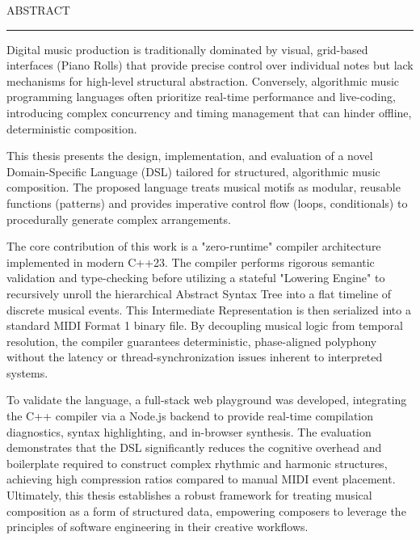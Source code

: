 ABSTRACT

\vspace{0.5cm}
\hrule
\vspace{0.5cm}

Digital music production is traditionally dominated by visual, grid-based interfaces (Piano Rolls) that
provide precise control over individual notes but lack mechanisms for high-level structural abstraction.
Conversely, algorithmic music programming languages often prioritize real-time performance and live-coding,
introducing complex concurrency and timing management that can hinder offline, deterministic composition.

This thesis presents the design, implementation, and evaluation of a novel Domain-Specific Language (DSL)
tailored for structured, algorithmic music composition. The proposed language treats musical motifs as
modular, reusable functions (patterns) and provides imperative control flow (loops, conditionals) to
procedurally generate complex arrangements.

The core contribution of this work is a "zero-runtime" compiler architecture implemented in modern C++23. The
compiler performs rigorous semantic validation and type-checking before utilizing a stateful "Lowering
Engine" to recursively unroll the hierarchical Abstract Syntax Tree into a flat timeline of discrete musical
events. This Intermediate Representation is then serialized into a standard MIDI Format 1 binary file. By
decoupling musical logic from temporal resolution, the compiler guarantees deterministic, phase-aligned
polyphony without the latency or thread-synchronization issues inherent to interpreted systems.

To validate the language, a full-stack web playground was developed, integrating the C++ compiler via a
Node.js backend to provide real-time compilation diagnostics, syntax highlighting, and in-browser synthesis.
The evaluation demonstrates that the DSL significantly reduces the cognitive overhead and boilerplate
required to construct complex rhythmic and harmonic structures, achieving high compression ratios compared to
manual MIDI event placement. Ultimately, this thesis establishes a robust framework for treating musical
composition as a form of structured data, empowering composers to leverage the principles of software
engineering in their creative workflows.
